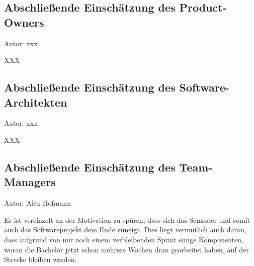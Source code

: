 \subsection{Abschließende Einschätzung des Product-Owners}
{\small Autor: xxx}

XXX

\subsection{Abschließende Einschätzung des Software-Architekten}
{\small Autor: xxx}

XXX

\subsection{Abschließende Einschätzung des Team-Managers}
{\small Autor: Alex Hofmann}

Es ist vereinzelt an der Motivation zu spüren, dass sich das Semester und somit auch das Softwareprojekt dem Ende zuneigt.
Dies liegt vermutlich auch daran, dass aufgrund von nur noch einem verbleibenden Sprint einige Komponenten, woran die Bachelor jetzt schon mehrere Wochen dran gearbeitet haben, auf der Strecke bleiben werden.
